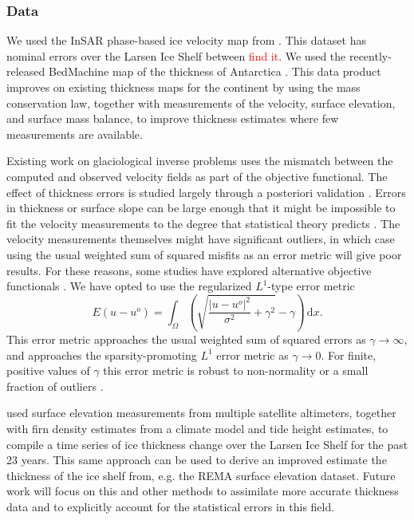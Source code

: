 \documentclass{article}
\theoremstyle{definition}
\theoremstyle{plain}
\newcommand{\ud}{\hspace{2pt}\mathrm{d}}
\begin{document}
\subsubsection{Data}

We used the InSAR phase-based ice velocity map from \citet{mouginot2019continent}.
This dataset has nominal errors over the Larsen Ice Shelf between \textcolor{red}{find it}.
We used the recently-released BedMachine map of the thickness of Antarctica \citep{morlighem2019deep}.
This data product improves on existing thickness maps for the continent by using the mass conservation law, together with measurements of the velocity, surface elevation, and surface mass balance, to improve thickness estimates where few measurements are available.

Existing work on glaciological inverse problems uses the mismatch between the computed and observed velocity fields as part of the objective functional.
The effect of thickness errors is studied largely through a posteriori validation \citep{joughin2004basal, larour2005rheology}.
Errors in thickness or surface slope can be large enough that it might be impossible to fit the velocity measurements to the degree that statistical theory predicts \citep{macayeal1995basal}.
The velocity measurements themselves might have significant outliers, in which case using the usual weighted sum of squared misfits as an error metric will give poor results.
For these reasons, some studies have explored alternative objective functionals \citep{morlighem2010spatial}.
We have opted to use the regularized $L^1$-type error metric
\begin{equation}
    E(u - u^o) = \int_\Omega\left(\sqrt{\frac{|u - u^o|^2}{\sigma^2} + \gamma^2} - \gamma\right)\ud x.
    \label{eq:l1-error-metric}
\end{equation}
This error metric approaches the usual weighted sum of squared errors as $\gamma \to \infty$, and approaches the sparsity-promoting $L^1$ error metric as $\gamma \to 0$.
For finite, positive values of $\gamma$ this error metric is robust to non-normality or a small fraction of outliers \citep{barron2019general}.

\citet{adusumilli2018variable} used surface elevation measurements from multiple satellite altimeters, together with firn density estimates from a climate model and tide height estimates, to compile a time series of ice thickness change over the Larsen Ice Shelf for the past 23 years.
This same approach can be used to derive an improved estimate the thickness of the ice shelf from, e.g. the REMA surface elevation dataset.
Future work will focus on this and other methods to assimilate more accurate thickness data and to explicitly account for the statistical errors in this field.
\end{document}
